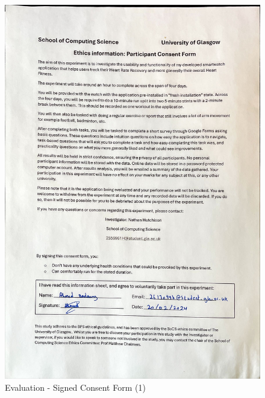 \documentclass{l4proj}
\begin{document}
\begin{figure}[h!]
    \centering
    \includegraphics[width=1\linewidth]{dissertation//dissImages/Consent1.jpg}
    \caption{Evaluation - Signed Consent Form (1)}
\end{figure}
\end{document}
